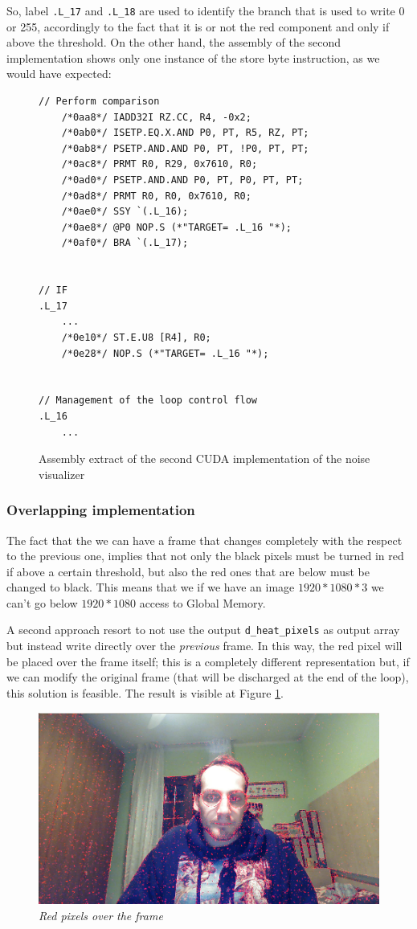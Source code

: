 \documentclass[paper=a4, fontsize=10pt]{scrartcl}	%
\begin{document}
	So, label \texttt{.L\_17} and \texttt{.L\_18} are used to identify the branch that is used to write 0 or 255, accordingly to the fact that it is or not the red component and only if above the threshold.\newline\newline
	On the other hand, the assembly of the second implementation shows only one instance of the store byte instruction, as we would have expected:
	\begin{figure}[H]
	\begin{lstlisting}[style=CStyle]
	// Perform comparison
	/*0aa8*/ IADD32I RZ.CC, R4, -0x2;
	/*0ab0*/ ISETP.EQ.X.AND P0, PT, R5, RZ, PT;
	/*0ab8*/ PSETP.AND.AND P0, PT, !P0, PT, PT;
	/*0ac8*/ PRMT R0, R29, 0x7610, R0;
	/*0ad0*/ PSETP.AND.AND P0, PT, P0, PT, PT;
	/*0ad8*/ PRMT R0, R0, 0x7610, R0;
	/*0ae0*/ SSY `(.L_16);
	/*0ae8*/ @P0 NOP.S (*"TARGET= .L_16 "*);
	/*0af0*/ BRA `(.L_17);


// IF
.L_17
	...
	/*0e10*/ ST.E.U8 [R4], R0;
	/*0e28*/ NOP.S (*"TARGET= .L_16 "*);


// Management of the loop control flow	
.L_16
	...\end{lstlisting}
	\caption{Assembly extract of the second CUDA implementation of the noise visualizer}
	\end{figure}
	

	
	\subsubsection{Overlapping implementation}
	The fact that the we can have a frame that changes completely with the respect to the previous one, implies that not only the black pixels must be turned in red if above a certain threshold, but also the red ones that are below must be changed to black. This means that we if we have an image $1920*1080*3$ we can't go below $1920*1080$ access to Global Memory. 
	
	A second approach resort to not use the output \texttt{d\_heat\_pixels} as output array but instead write directly over the \textit{previous} frame. In this way, the red pixel will be placed over the frame itself; this is a completely different representation but, if we can modify the original frame (that will be discharged at the end of the loop), this solution is feasible. The result is visible at Figure \ref{fig:red_frame}.
	
	\begin{figure}[H]
		\centering
		\includegraphics[width=0.45\linewidth]{images/heatmap/gpu_red_2}
		\caption{\textit{Red pixels over the frame}}
		\label{fig:red_frame}
	\end{figure}
	
\end{document}
